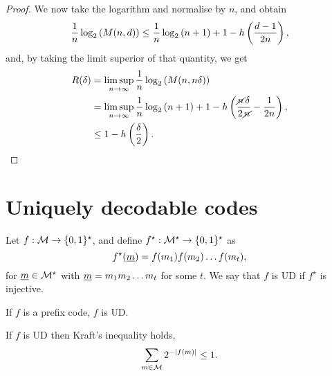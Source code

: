 \begin{proof}
	We now take the logarithm and normalise by $n$, and obtain
	\begin{equation*}
		\frac{1}{n} \log_2 \left( M(n, d) \right)
		\le
		\frac{1}{n} \log_2 \left( n+1 \right) + 1 - h\left({\frac{d-1}{2n}}\right),
	\end{equation*}
	and, by taking the limit superior of that quantity, we get
	\begin{align*}
		R(\delta)
		& =
		\limsup_{n \to \infty} \frac{1}{n} \log_2 \left( {M(n, n \delta)} \right)
		\\
		& =
		\limsup_{n \to \infty}
		\frac{1}{n} \log_2 \left( {n+1} \right)	
		+ 1 - h\left({
			\frac{\cancel{n} \, \delta}{2 \, \cancel{n}}
			- \frac{1}{2n}
		}\right),
		\\
		& \le
		1 - h\left({\frac{\delta}{2}}\right). \qedhere
	\end{align*}
\end{proof}

\section{Uniquely decodable codes}

\begin{definition}
	Let $f : \mathcal{M} \to \{0,1\}^{\star}$, and define $f^{\star} : \mathcal{M}^{\star} \to \{0,1\}^{\star}$ as
	\begin{equation*}
		f^{\star} (\underline{m}) = f(m_1) f(m_2) \dots f(m_t),
	\end{equation*}
	for $\underline{m} \in \mathcal{M}^{\star}$ with $\underline{m} = m_1 m_2 \dots m_t$ for some $t$.
	We say that $f$ is \ac{UD} if $f^{\star}$ is injective.
\end{definition}
If $f$ is a prefix code, $f$ is \ac{UD}.

\begin{thm}
	If $f$ is \ac{UD} then Kraft's inequality holds, \ie
	\begin{equation*}
		\sum_{m \in \mathcal{M}} 2^{-\left|{f(m)}\right|} \le 1.
	\end{equation*}
\end{thm}


